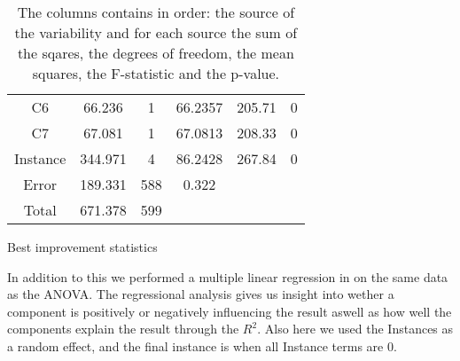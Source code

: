\documentclass[../main.tex]{subfiles}
\begin{document}
\begin{table}
\begin{adjustbox}{width=\columnwidth,center}
\begin{subtable}{.75\columnwidth}
\begin{tabular}{cccccc}
            C6      & 66.236    & 1 & 66.2357   & 205.71& 0     \\
            C7      & 67.081    & 1 & 67.0813   & 208.33& 0     \\
            Instance& 344.971   & 4 & 86.2428   & 267.84& 0     \\
            Error   & 189.331   &588& 0.322     &       &       \\
            Total   & 671.378   &599&           &       &       \\
            \hline
            \end{tabular}
        \caption{Best improvement statistics}
        \label{tab:anovaBestNormal}
        \end{subtable}
    \end{adjustbox}
    \label{tab:anovaNormal}
    \caption*{The columns contains in order: the source of the variability and for each source the sum of the sqares, the degrees of freedom, the mean squares, the F-statistic and the p-value.}
\end{table}

In addition to this we performed a multiple linear regression in  on the same data as the ANOVA.
The regressional analysis gives us insight into wether a component is positively or negatively influencing the result aswell as how well the components explain the result through the $R^2$.
Also here we used the Instances as a random effect, and the final instance is when all Instance terms are 0.
\end{document}
